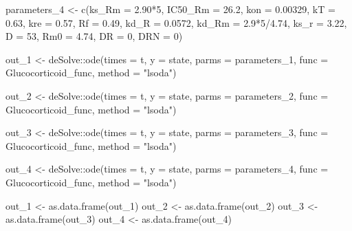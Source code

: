 \documentclass[
]{article}
\newenvironment{Shaded}{\begin{snugshade}}{\end{snugshade}}
\newcommand{\AttributeTok}[1]{\textcolor[rgb]{0.77,0.63,0.00}{#1}}
\newcommand{\DecValTok}[1]{\textcolor[rgb]{0.00,0.00,0.81}{#1}}
\newcommand{\FloatTok}[1]{\textcolor[rgb]{0.00,0.00,0.81}{#1}}
\newcommand{\FunctionTok}[1]{\textcolor[rgb]{0.00,0.00,0.00}{#1}}
\newcommand{\NormalTok}[1]{#1}
\newcommand{\OtherTok}[1]{\textcolor[rgb]{0.56,0.35,0.01}{#1}}
\newcommand{\SpecialCharTok}[1]{\textcolor[rgb]{0.00,0.00,0.00}{#1}}
\newcommand{\StringTok}[1]{\textcolor[rgb]{0.31,0.60,0.02}{#1}}
\begin{document}
\begin{Shaded}
\begin{Highlighting}[]
\NormalTok{parameters\_4 }\OtherTok{\textless{}{-}} \FunctionTok{c}\NormalTok{(}\AttributeTok{ks\_Rm =} \FloatTok{2.90}\SpecialCharTok{*}\DecValTok{5}\NormalTok{, }\AttributeTok{IC50\_Rm =} \FloatTok{26.2}\NormalTok{, }\AttributeTok{kon =} \FloatTok{0.00329}\NormalTok{,}
                \AttributeTok{kT =} \FloatTok{0.63}\NormalTok{, }\AttributeTok{kre =} \FloatTok{0.57}\NormalTok{, }\AttributeTok{Rf =} \FloatTok{0.49}\NormalTok{, }\AttributeTok{kd\_R =} \FloatTok{0.0572}\NormalTok{,}
                \AttributeTok{kd\_Rm =} \FloatTok{2.9}\SpecialCharTok{*}\DecValTok{5}\SpecialCharTok{/}\FloatTok{4.74}\NormalTok{, }\AttributeTok{ks\_r =} \FloatTok{3.22}\NormalTok{, }\AttributeTok{D =} \DecValTok{53}\NormalTok{, }\AttributeTok{Rm0 =} \FloatTok{4.74}\NormalTok{,}
                \AttributeTok{DR =} \DecValTok{0}\NormalTok{, }\AttributeTok{DRN =} \DecValTok{0}\NormalTok{)}

\NormalTok{out\_1 }\OtherTok{\textless{}{-}}\NormalTok{ deSolve}\SpecialCharTok{::}\FunctionTok{ode}\NormalTok{(}\AttributeTok{times =}\NormalTok{ t, }\AttributeTok{y =}\NormalTok{ state, }\AttributeTok{parms =}\NormalTok{ parameters\_1,}
                    \AttributeTok{func =}\NormalTok{ Glucocorticoid\_func, }\AttributeTok{method =} \StringTok{"lsoda"}\NormalTok{)}

\NormalTok{out\_2 }\OtherTok{\textless{}{-}}\NormalTok{ deSolve}\SpecialCharTok{::}\FunctionTok{ode}\NormalTok{(}\AttributeTok{times =}\NormalTok{ t, }\AttributeTok{y =}\NormalTok{ state, }\AttributeTok{parms =}\NormalTok{ parameters\_2,}
                    \AttributeTok{func =}\NormalTok{ Glucocorticoid\_func, }\AttributeTok{method =} \StringTok{"lsoda"}\NormalTok{)}

\NormalTok{out\_3 }\OtherTok{\textless{}{-}}\NormalTok{ deSolve}\SpecialCharTok{::}\FunctionTok{ode}\NormalTok{(}\AttributeTok{times =}\NormalTok{ t, }\AttributeTok{y =}\NormalTok{ state, }\AttributeTok{parms =}\NormalTok{ parameters\_3,}
                    \AttributeTok{func =}\NormalTok{ Glucocorticoid\_func, }\AttributeTok{method =} \StringTok{"lsoda"}\NormalTok{)}

\NormalTok{out\_4 }\OtherTok{\textless{}{-}}\NormalTok{ deSolve}\SpecialCharTok{::}\FunctionTok{ode}\NormalTok{(}\AttributeTok{times =}\NormalTok{ t, }\AttributeTok{y =}\NormalTok{ state, }\AttributeTok{parms =}\NormalTok{ parameters\_4,}
                    \AttributeTok{func =}\NormalTok{ Glucocorticoid\_func, }\AttributeTok{method =} \StringTok{"lsoda"}\NormalTok{)}

\NormalTok{out\_1 }\OtherTok{\textless{}{-}} \FunctionTok{as.data.frame}\NormalTok{(out\_1)}
\NormalTok{out\_2 }\OtherTok{\textless{}{-}} \FunctionTok{as.data.frame}\NormalTok{(out\_2)}
\NormalTok{out\_3 }\OtherTok{\textless{}{-}} \FunctionTok{as.data.frame}\NormalTok{(out\_3)}
\NormalTok{out\_4 }\OtherTok{\textless{}{-}} \FunctionTok{as.data.frame}\NormalTok{(out\_4)}


\end{Highlighting}
\end{Shaded}
\end{document}
